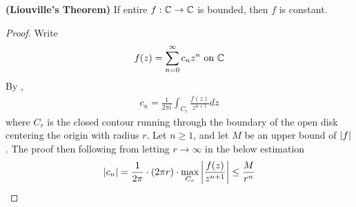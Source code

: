 \documentclass{report}
\begin{document}
\begin{theorem}
\label{LV}
\textbf{(Liouville's Theorem)} If entire $f:\mathbb{C}\rightarrow \mathbb{C}$ is bounded, then $f$ is constant. 
\end{theorem}
\begin{proof}
Write 
\begin{align*}
f(z)=\sum_{n=0}^{\infty}c_nz^n\text{ on }\mathbb{C}
\end{align*}
By , 
\begin{align*}
c_n= \frac{1}{2\pi i}\int_{C_r} \frac{f(z)}{z^{n+1}}dz
\end{align*}
where $C_r$ is the closed contour running through the boundary of the open disk centering  the origin with radius  $r$. Let $n\geq 1$, and let  $M$ be an upper bound of $\left|f\right|$. The proof then following from letting $r \to \infty$ in the below estimation 
\begin{align*}
\left|c_n\right|= \frac{1}{2\pi } \cdot (2\pi r) \cdot \max_{C_r} \left|\frac{f(z)}{z^{n+1}}\right| \leq \frac{M}{r^n}
\end{align*}
\end{proof}
\end{document}
